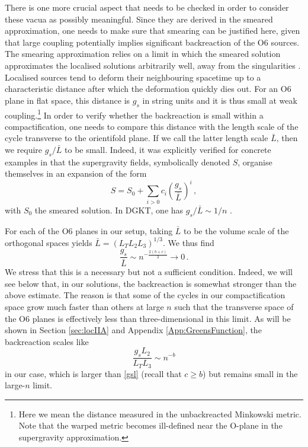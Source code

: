 \documentclass[11pt]{article}
\newcommand{\be}{\begin{equation}}
\newcommand{\ee}{\end{equation}}
\def\be{\begin{equation}}
\def\ee{\end{equation}}
\renewcommand{\[}{\left[}
\renewcommand{\]}{\right]}
\renewcommand{\(}{\left(}
\renewcommand{\)}{\right)}
\newcommand{\<}{\langle}
\renewcommand{\>}{\rangle}
\begin{document}
There is one more crucial aspect that needs to be checked in order to consider these vacua as possibly meaningful. Since they are derived in the smeared approximation, one needs to make sure that smearing can be justified here, given that large coupling potentially implies significant  backreaction of the O6 sources. The smearing approximation relies on a limit in which the smeared solution approximates the localised solutions arbitrarily well, away from the singularities \cite{Baines:2020dmu,Marchesano:2020qvg,Junghans:2020acz}. Localised sources tend to deform their neighbouring spacetime up to a characteristic distance after which the deformation quickly dies out. For an O6 plane in flat space, this distance is $g_s$ in string units and it is thus small at weak coupling.\footnote{Here we mean the distance measured in the unbackreacted Minkowski metric. Note that the warped metric becomes ill-defined near the O-plane in the supergravity approximation.} In order to verify whether the backreaction is small within a compactification, one needs to compare this distance with the length scale of the cycle transverse to the orientifold plane. If we call the latter length scale $\bar{L}$, then we require $g_s/\bar{L}$ to be small. Indeed, it was explicitly verified for concrete examples in \cite{Marchesano:2020qvg, Junghans:2020acz, Baines:2020dmu} that the supergravity fields, symbolically denoted $S$, organise themselves in an expansion of the form
\be
S=S_0 + \sum_{i>0} c_i \left(\frac{g_s}{\bar{L}}\right)^i\,,
\ee
with $S_0$ the smeared solution. In DGKT, one has $g_s/\bar{L}\sim 1/n$ \cite{Marchesano:2020qvg,Junghans:2020acz}.

For each of the O6 planes in our setup, taking $\bar{L}$ to be the volume scale of the orthogonal spaces yields $\bar{L}=(L_TL_2L_3)^{1/3}$. We thus find
\be
\frac{g_s}{\bar{L}} \sim n^{-\frac{2(b+c)}{3}} \rightarrow 0  \,. \label{gsl}
\ee 
We stress that this is a necessary but not a sufficient condition. Indeed, we will see below that, in our solutions, the backreaction is somewhat stronger than the above estimate. The reason is that some of the cycles in our compactification space grow much faster than others at large $n$ such that the transverse space of the O6 planes is effectively less than three-dimensional in this limit. As will be shown in Section \ref{sec:locIIA} and Appendix \ref{App:GreensFunction}, the backreaction scales like
\begin{equation}
\frac{g_sL_2}{L_TL_3} \sim n^{-b}
\end{equation}
in our case, which is larger than \eqref{gsl} (recall that $c\ge b$) but remains small in the large-$n$ limit.
\end{document}
